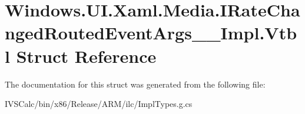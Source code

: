 \hypertarget{struct_windows_1_1_u_i_1_1_xaml_1_1_media_1_1_i_rate_changed_routed_event_args_____impl_1_1_vtbl}{}\section{Windows.\+U\+I.\+Xaml.\+Media.\+I\+Rate\+Changed\+Routed\+Event\+Args\+\_\+\+\_\+\+Impl.\+Vtbl Struct Reference}
\label{struct_windows_1_1_u_i_1_1_xaml_1_1_media_1_1_i_rate_changed_routed_event_args_____impl_1_1_vtbl}


The documentation for this struct was generated from the following file\+:\begin{DoxyCompactItemize}
\item 
I\+V\+S\+Calc/bin/x86/\+Release/\+A\+R\+M/ilc/Impl\+Types.\+g.\+cs\end{DoxyCompactItemize}
